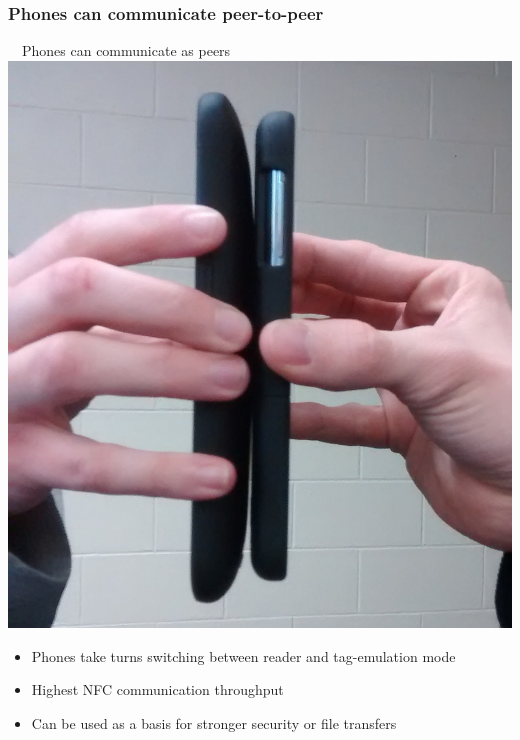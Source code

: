\documentclass[unknownkeysallowed]{beamer}
\begin{document}
\begin{frame}
\frametitle{Phones can communicate peer-to-peer}
  \begin{center}
  \begin{minipage}{.7\textwidth}
  \begin{block}{~~Phones can communicate as peers}\centering
      \includegraphics[width=\linewidth,height=0.2\textheight,keepaspectratio]{figures/peer.jpg}
      \begin{itemize}
  		  \item{Phones take turns switching between reader and tag-emulation mode}
        \pause
  		  \item{Highest NFC communication throughput}
        \pause
  		  \item{Can be used as a basis for stronger security or file transfers}
     	\end{itemize}
  \end{block}
  \end{minipage}
  \end{center}
\end{frame}
\end{document}
